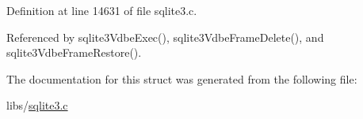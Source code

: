 Definition at line 14631 of file sqlite3.\+c.



Referenced by sqlite3\+Vdbe\+Exec(), sqlite3\+Vdbe\+Frame\+Delete(), and sqlite3\+Vdbe\+Frame\+Restore().



The documentation for this struct was generated from the following file\+:\begin{DoxyCompactItemize}
\item 
libs/\hyperlink{sqlite3_8c}{sqlite3.\+c}\end{DoxyCompactItemize}
